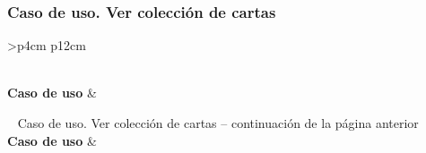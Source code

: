 \subsubsection{Caso de uso. Ver colección de cartas} \label{sec:cu_coleccion-cartas}
\begin{longtable}{
    >{}p{4cm}
    p{12cm}
    }
    \caption{Caso de uso. Ver colección de cartas} \label{table:cu_coleccion-cartas} \\
    \toprule
    \textbf{Caso de uso} &  \\
    \endfirsthead
    
    {{ \tablename\ \thetable{} Caso de uso. Ver colección de cartas -- continuación de la página anterior}} \\
    \toprule
    \textbf{Caso de uso} &  \\
    \midrule
    \endhead
    
    \midrule
     \\ 
    \endfoot
    
    \bottomrule
    \endlastfoot
    

\end{longtable}
